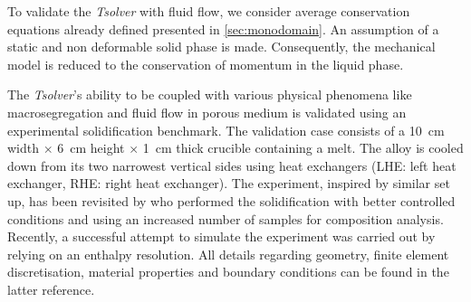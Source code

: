 To validate the \emph{Tsolver} with fluid flow, we consider average conservation equations
already defined presented in \cref{sec:monodomain}. An assumption 
of a static and non deformable solid phase is made. Consequently, the mechanical model is 
reduced to the conservation of momentum in the liquid phase. 

%

The \emph{Tsolver}’s ability to be coupled with various physical phenomena like macrosegregation and fluid flow 
in porous medium is validated using an experimental solidification benchmark. 
The validation case consists of a \SI{10}{\centi \metre}
width $\times$ \SI{6}{\centi \metre} height $\times$ \SI{1}{\centi \metre} thick crucible containing 
a  melt. The alloy is cooled down from its two 
narrowest vertical sides using heat exchangers (LHE: left heat exchanger, RHE: right heat exchanger). The 
experiment, inspired by \citet{hebditch_observations_1974} similar set up, has been 
revisited by \citet{hachani_experimental_2012} who performed the solidification with better 
controlled conditions and using an increased number of samples for composition analysis. Recently, a successful 
attempt to simulate the experiment was carried out by \citet{carozzani_direct_2013} relying on an enthalpy resolution. 
All details regarding geometry, finite element discretisation, material properties 
and boundary conditions can be found in the latter reference. 

